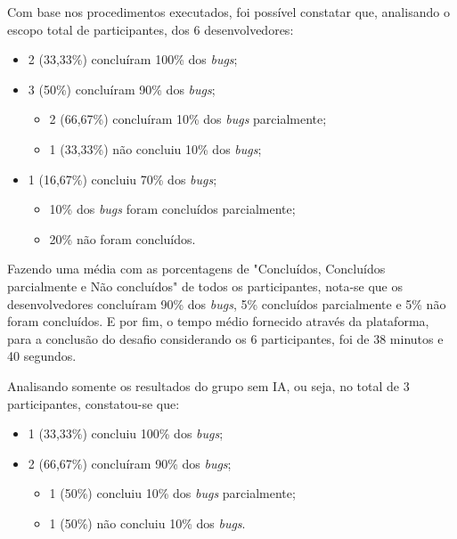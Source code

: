 \documentclass[english,brazilian]{UNISINOSartigo} %
\begin{document}
Com base nos procedimentos executados, foi possível constatar que, analisando o escopo total de participantes, dos 6 desenvolvedores:

\begin{itemize}[leftmargin=1cm, itemsep=0.1em, topsep=0.1em]
    \item 2 (33,33\%) concluíram 100\% dos \textit{bugs};
    \item 3 (50\%) concluíram 90\% dos \textit{bugs};
    \begin{itemize}[leftmargin=1.2cm, itemsep=0.1em, topsep=0.1em]
        \item 2 (66,67\%) concluíram 10\% dos \textit{bugs} parcialmente;
        \item 1 (33,33\%) não concluiu 10\% dos \textit{bugs};
    \end{itemize}
    \item 1 (16,67\%) concluiu 70\% dos \textit{bugs};
    \begin{itemize}[leftmargin=1.2cm, itemsep=0.1em, topsep=0.1em]
        \item 10\% dos \textit{bugs} foram concluídos parcialmente;
        \item 20\% não foram concluídos.
    \end{itemize}
\end{itemize}

Fazendo uma média com as porcentagens de "Concluídos, Concluídos parcialmente e Não concluídos" de todos os participantes, nota-se que os desenvolvedores concluíram 90\% dos \textit{bugs}, 5\% concluídos parcialmente e 5\% não foram concluídos. E por fim, o tempo médio fornecido através da plataforma, para a conclusão do desafio considerando os 6 participantes, foi de 38 minutos e 40 segundos.

Analisando somente os resultados do grupo sem IA, ou seja, no total de 3 participantes, constatou-se que:

\begin{itemize}[leftmargin=1cm, itemsep=0.1em, topsep=0.1em]
    \item 1 (33,33\%) concluiu 100\% dos \textit{bugs};
    \item 2 (66,67\%) concluíram 90\% dos \textit{bugs};
    \begin{itemize}[leftmargin=1.2cm, itemsep=0.1em, topsep=0.1em]
        \item 1 (50\%) concluiu 10\% dos \textit{bugs} parcialmente;
        \item 1 (50\%) não concluiu 10\% dos \textit{bugs}.
    \end{itemize}
\end{itemize}
\end{document}

